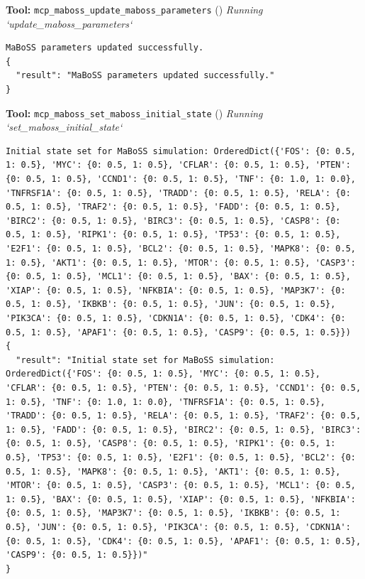 \documentclass[11pt,a4paper]{article}
\begin{document}
\begin{toolokbox}
\textbf{Tool:} \texttt{mcp\_maboss\_update\_maboss\_parameters} (\checkmark)
\textit{Running `update\_maboss\_parameters`}
\begin{lstlisting}
MaBoSS parameters updated successfully.
{
  "result": "MaBoSS parameters updated successfully."
}
\end{lstlisting}
\end{toolokbox}
\begin{toolokbox}
\textbf{Tool:} \texttt{mcp\_maboss\_set\_maboss\_initial\_state} (\checkmark)
\textit{Running `set\_maboss\_initial\_state`}
\begin{lstlisting}
Initial state set for MaBoSS simulation: OrderedDict({'FOS': {0: 0.5, 1: 0.5}, 'MYC': {0: 0.5, 1: 0.5}, 'CFLAR': {0: 0.5, 1: 0.5}, 'PTEN': {0: 0.5, 1: 0.5}, 'CCND1': {0: 0.5, 1: 0.5}, 'TNF': {0: 1.0, 1: 0.0}, 'TNFRSF1A': {0: 0.5, 1: 0.5}, 'TRADD': {0: 0.5, 1: 0.5}, 'RELA': {0: 0.5, 1: 0.5}, 'TRAF2': {0: 0.5, 1: 0.5}, 'FADD': {0: 0.5, 1: 0.5}, 'BIRC2': {0: 0.5, 1: 0.5}, 'BIRC3': {0: 0.5, 1: 0.5}, 'CASP8': {0: 0.5, 1: 0.5}, 'RIPK1': {0: 0.5, 1: 0.5}, 'TP53': {0: 0.5, 1: 0.5}, 'E2F1': {0: 0.5, 1: 0.5}, 'BCL2': {0: 0.5, 1: 0.5}, 'MAPK8': {0: 0.5, 1: 0.5}, 'AKT1': {0: 0.5, 1: 0.5}, 'MTOR': {0: 0.5, 1: 0.5}, 'CASP3': {0: 0.5, 1: 0.5}, 'MCL1': {0: 0.5, 1: 0.5}, 'BAX': {0: 0.5, 1: 0.5}, 'XIAP': {0: 0.5, 1: 0.5}, 'NFKBIA': {0: 0.5, 1: 0.5}, 'MAP3K7': {0: 0.5, 1: 0.5}, 'IKBKB': {0: 0.5, 1: 0.5}, 'JUN': {0: 0.5, 1: 0.5}, 'PIK3CA': {0: 0.5, 1: 0.5}, 'CDKN1A': {0: 0.5, 1: 0.5}, 'CDK4': {0: 0.5, 1: 0.5}, 'APAF1': {0: 0.5, 1: 0.5}, 'CASP9': {0: 0.5, 1: 0.5}})
{
  "result": "Initial state set for MaBoSS simulation: OrderedDict({'FOS': {0: 0.5, 1: 0.5}, 'MYC': {0: 0.5, 1: 0.5}, 'CFLAR': {0: 0.5, 1: 0.5}, 'PTEN': {0: 0.5, 1: 0.5}, 'CCND1': {0: 0.5, 1: 0.5}, 'TNF': {0: 1.0, 1: 0.0}, 'TNFRSF1A': {0: 0.5, 1: 0.5}, 'TRADD': {0: 0.5, 1: 0.5}, 'RELA': {0: 0.5, 1: 0.5}, 'TRAF2': {0: 0.5, 1: 0.5}, 'FADD': {0: 0.5, 1: 0.5}, 'BIRC2': {0: 0.5, 1: 0.5}, 'BIRC3': {0: 0.5, 1: 0.5}, 'CASP8': {0: 0.5, 1: 0.5}, 'RIPK1': {0: 0.5, 1: 0.5}, 'TP53': {0: 0.5, 1: 0.5}, 'E2F1': {0: 0.5, 1: 0.5}, 'BCL2': {0: 0.5, 1: 0.5}, 'MAPK8': {0: 0.5, 1: 0.5}, 'AKT1': {0: 0.5, 1: 0.5}, 'MTOR': {0: 0.5, 1: 0.5}, 'CASP3': {0: 0.5, 1: 0.5}, 'MCL1': {0: 0.5, 1: 0.5}, 'BAX': {0: 0.5, 1: 0.5}, 'XIAP': {0: 0.5, 1: 0.5}, 'NFKBIA': {0: 0.5, 1: 0.5}, 'MAP3K7': {0: 0.5, 1: 0.5}, 'IKBKB': {0: 0.5, 1: 0.5}, 'JUN': {0: 0.5, 1: 0.5}, 'PIK3CA': {0: 0.5, 1: 0.5}, 'CDKN1A': {0: 0.5, 1: 0.5}, 'CDK4': {0: 0.5, 1: 0.5}, 'APAF1': {0: 0.5, 1: 0.5}, 'CASP9': {0: 0.5, 1: 0.5}})"
}
\end{lstlisting}
\end{toolokbox}
\end{document}
